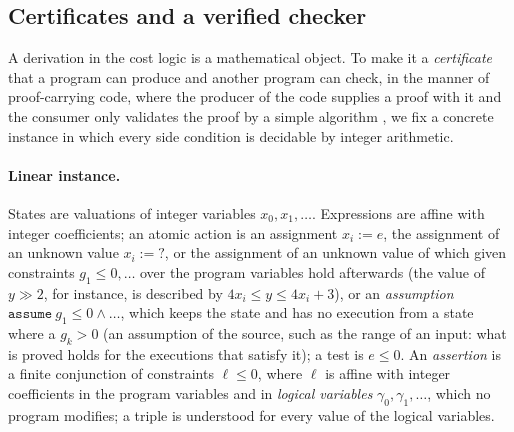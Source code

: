 \documentclass[oneside,english]{amsart}
\numberwithin{equation}{section}
\numberwithin{figure}{section}
\theoremstyle{plain}
\theoremstyle{definition}
\theoremstyle{plain}
\theoremstyle{remark}
\theoremstyle{plain}
\theoremstyle{definition}
\theoremstyle{plain}
\theoremstyle{remark}
\begin{document}
\subsection{Certificates and a verified checker}
\label{subsec:checker}

A derivation in the cost logic is a mathematical object. To make it a \emph{certificate} that a program can produce and another program can check, in the manner of proof-carrying code, where the producer of the code supplies a proof with it and the consumer only validates the proof by a simple algorithm \cite{necula1997proof}, we fix a concrete instance in which every side condition is decidable by integer arithmetic.

\paragraph{Linear instance.}
States are valuations of integer variables $x_0, x_1, \dots$. Expressions are affine with integer coefficients; an atomic action is an assignment $x_i := e$, the assignment of an unknown value $x_i := {?}$, or the assignment of an unknown value of which given constraints $g_1 \le 0, \dots$ over the program variables hold afterwards (the value of $y \gg 2$, for instance, is described by $4 x_i \le y \le 4 x_i + 3$), or an \emph{assumption} $\mathtt{assume}\ g_1 \le 0 \wedge \dots$, which keeps the state and has no execution from a state where a $g_k > 0$ (an assumption of the source, such as the range of an input: what is proved holds for the executions that satisfy it); a test is $e \le 0$. An \emph{assertion} is a finite conjunction of constraints $\ell \le 0$, where $\ell$ is affine with integer coefficients in the program variables and in \emph{logical variables} $\gamma_0, \gamma_1, \dots$, which no program modifies; a triple is understood for every value of the logical variables.
\end{document}
